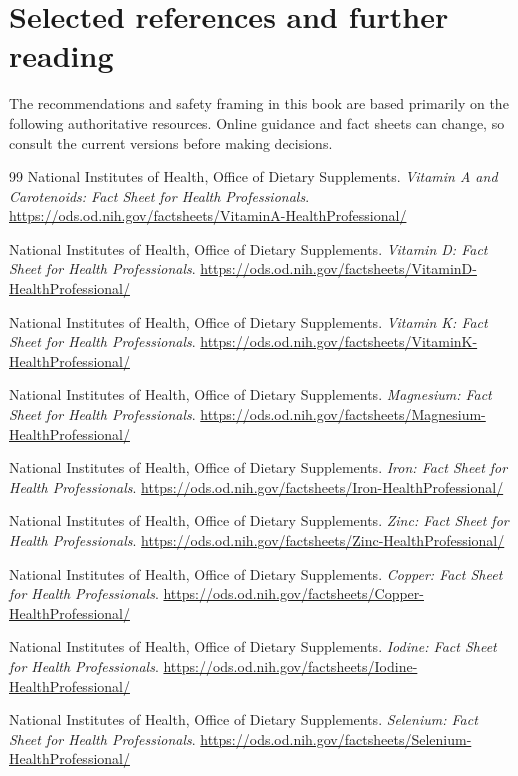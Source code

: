 \chapter{Selected references and further reading}

The recommendations and safety framing in this book are based primarily on the following authoritative resources. Online guidance and fact sheets can change, so consult the current versions before making decisions.

\begin{thebibliography}{99}
 National Institutes of Health, Office of Dietary Supplements. \emph{Vitamin A and Carotenoids: Fact Sheet for Health Professionals}. \url{https://ods.od.nih.gov/factsheets/VitaminA-HealthProfessional/}

 National Institutes of Health, Office of Dietary Supplements. \emph{Vitamin D: Fact Sheet for Health Professionals}. \url{https://ods.od.nih.gov/factsheets/VitaminD-HealthProfessional/}

 National Institutes of Health, Office of Dietary Supplements. \emph{Vitamin K: Fact Sheet for Health Professionals}. \url{https://ods.od.nih.gov/factsheets/VitaminK-HealthProfessional/}

 National Institutes of Health, Office of Dietary Supplements. \emph{Magnesium: Fact Sheet for Health Professionals}. \url{https://ods.od.nih.gov/factsheets/Magnesium-HealthProfessional/}

 National Institutes of Health, Office of Dietary Supplements. \emph{Iron: Fact Sheet for Health Professionals}. \url{https://ods.od.nih.gov/factsheets/Iron-HealthProfessional/}

 National Institutes of Health, Office of Dietary Supplements. \emph{Zinc: Fact Sheet for Health Professionals}. \url{https://ods.od.nih.gov/factsheets/Zinc-HealthProfessional/}

 National Institutes of Health, Office of Dietary Supplements. \emph{Copper: Fact Sheet for Health Professionals}. \url{https://ods.od.nih.gov/factsheets/Copper-HealthProfessional/}

 National Institutes of Health, Office of Dietary Supplements. \emph{Iodine: Fact Sheet for Health Professionals}. \url{https://ods.od.nih.gov/factsheets/Iodine-HealthProfessional/}

 National Institutes of Health, Office of Dietary Supplements. \emph{Selenium: Fact Sheet for Health Professionals}. \url{https://ods.od.nih.gov/factsheets/Selenium-HealthProfessional/}


\end{thebibliography}
